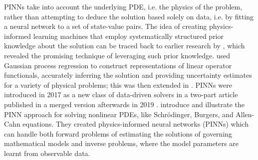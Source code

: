 \documentclass[pdflatex,sn-basic]{sn-jnl}%
\theoremstyle{thmstyleone}%
\theoremstyle{thmstyletwo}%
\theoremstyle{thmstylethree}%
\begin{document}
PINNs take into account the underlying PDE, i.e. the physics of the problem, rather than attempting to deduce the solution based solely on data, i.e. by fitting a neural network to a set of state-value pairs.
%
The idea of creating physics-informed learning machines that employ systematically structured prior knowledge about the solution can be traced back to earlier research by \cite{Owh2015_BayesianNumericalHomogenization_Owh}, which revealed the promising technique of leveraging such prior knowledge.
%
\cite{Rai2017_InferringSolutionsDifferential_PerRPK, Rai2017_MachineLearningLinear_PerRPK} used Gaussian process regression to construct representations of linear operator functionals, accurately inferring the solution and providing uncertainty estimates for a variety of physical problems; this was then extended in \citep{Rai2018_HiddenPhysicsModels_KarRK, Rai2018_NumericalGaussianProcesses_PerRPK}.
%
PINNs were introduced in 2017 as a new class of data-driven solvers in a two-part article \citep{Rai2017_PhysicsInformedDeep1_PerRPK,Rai2017_PhysicsInformedDeep2_PerRPK} published in a merged version afterwards in 2019 \citep{Rai2019_PhysicsInformedNeural_PerRPK}.
%
\cite{Rai2019_PhysicsInformedNeural_PerRPK}
 introduce and illustrate the PINN approach for solving nonlinear PDEs, like Schrödinger, Burgers, and Allen-Cahn equations. %
%
They created physics-informed neural networks (PINNs) 
which can handle both forward problems of estimating the solutions of governing mathematical models and inverse problems, where the model parameters are learnt from observable data.
\end{document}
